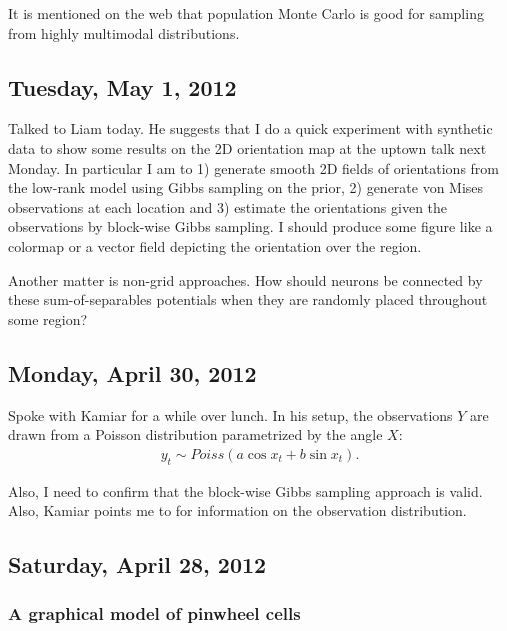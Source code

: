 \documentclass[11pt]{article}
\newcommand{\paperlink}[1]{\href{../../../../papers/#1.pdf}{\cite{#1}}}
\begin{document}
It is mentioned on the web that population Monte Carlo is good for sampling from highly multimodal distributions.

\subsection*{Tuesday, May 1, 2012}
Talked to Liam today. He suggests that I do a quick experiment with synthetic data to show some results on the 2D orientation map at the uptown talk next Monday. In particular I am to 1) generate smooth 2D fields of orientations from the low-rank model using Gibbs sampling on the prior, 2) generate von Mises observations at each location and 3) estimate the orientations given the observations by block-wise Gibbs sampling. I should produce some figure like a colormap or a vector field depicting the orientation over the region.

Another matter is non-grid approaches. How should neurons be connected by these sum-of-separables potentials when they are randomly placed throughout some region?

\subsection*{Monday, April 30, 2012}

Spoke with Kamiar for a while over lunch. In his setup, the observations $Y$ are drawn from a Poisson distribution parametrized by the angle $X$:
%
\begin{align*}
y_t \sim Poiss(a\cos x_t + b\sin x_t).
\end{align*}

\noindent Also, I need to confirm that the block-wise Gibbs sampling approach is valid. Also, Kamiar points me to \paperlink{Macke_2009} for information on the observation distribution.

\subsection*{Saturday, April 28, 2012}

\subsubsection*{A graphical model of pinwheel cells}
\end{document}
